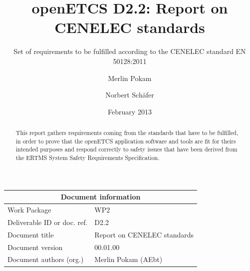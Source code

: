 \documentclass{template/openetcs_report}
\begin{document}
\frontmatter
{}




\title{openETCS D2.2: Report on CENELEC standards}

\subtitle{Set of requirements to be fulfilled according to the CENELEC standard EN 50128:2011}

\date{February 2013}

\author{Merlin Pokam \and Norbert Sch\"afer}






\begin{abstract}
This report gathers requirements coming from the standards that have to be fulfilled, in order to prove that the openETCS application software and tools are fit for theirs intended purposes and respond correctly to safety issues that have been derived from the ERTMS System Safety Requirements Specification.
\end{abstract}

\maketitle

\begin{tabular}{|p{4.4cm}|p{8.7cm}|}
\hline
\multicolumn{2}{|c|}{\textbf{Document information}} \\
\hline
Work Package &  WP2  \\
Deliverable ID or doc. ref. & D2.2\\
\hline
Document title & Report on CENELEC standards \\
Document version & 00.01.00 \\
Document authors (org.)  & Merlin Pokam (AEbt) \\
\hline
\end{tabular}
\end{document}
